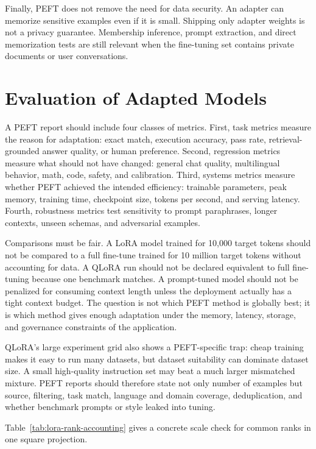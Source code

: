 Finally, PEFT does not remove the need for data security. An adapter can memorize sensitive examples even if it is small. Shipping only adapter weights is not a privacy guarantee. Membership inference, prompt extraction, and direct memorization tests are still relevant when the fine-tuning set contains private documents or user conversations.

\section{Evaluation of Adapted Models}
\label{sec:peft-evaluation}

A PEFT report should include four classes of metrics. First, task metrics measure the reason for adaptation: exact match, execution accuracy, pass rate, retrieval-grounded answer quality, or human preference. Second, regression metrics measure what should not have changed: general chat quality, multilingual behavior, math, code, safety, and calibration. Third, systems metrics measure whether PEFT achieved the intended efficiency: trainable parameters, peak memory, training time, checkpoint size, tokens per second, and serving latency. Fourth, robustness metrics test sensitivity to prompt paraphrases, longer contexts, unseen schemas, and adversarial examples.

Comparisons must be fair. A LoRA model trained for 10,000 target tokens should not be compared to a full fine-tune trained for 10 million target tokens without accounting for data. A QLoRA run should not be declared equivalent to full fine-tuning because one benchmark matches. A prompt-tuned model should not be penalized for consuming context length unless the deployment actually has a tight context budget. The question is not which PEFT method is globally best; it is which method gives enough adaptation under the memory, latency, storage, and governance constraints of the application.

QLoRA's large experiment grid also shows a PEFT-specific trap: cheap training makes it easy to run many datasets, but dataset suitability can dominate dataset size. A small high-quality instruction set may beat a much larger mismatched mixture. PEFT reports should therefore state not only number of examples but source, filtering, task match, language and domain coverage, deduplication, and whether benchmark prompts or style leaked into tuning.

Table~\ref{tab:lora-rank-accounting} gives a concrete scale check for common ranks in one square projection.

